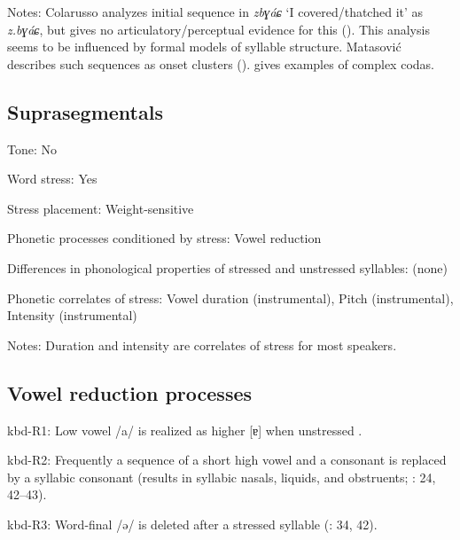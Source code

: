 {\begin{appendixdesc}
\item[Notes:] Colarusso analyzes initial sequence in \textit{zbɣáɕ} ‘I covered/thatched it’ as \textit{z.bɣáɕ}, but gives no articulatory/perceptual evidence for this (\citeyear[17]{Colarusso2006}). This analysis seems to be influenced by formal models of syllable structure. Matasović describes such sequences as onset clusters (\citeyear[13]{Matasović2010}). \citet{Applebaum2013} gives examples of complex codas.
\end{appendixdesc}
\subsection*{Suprasegmentals}
\begin{appendixdesc}
\item[Tone:] No

\item[Word stress:] Yes

\item[Stress placement:] Weight-sensitive

\item[Phonetic processes conditioned by stress:] Vowel reduction

\item[Differences in phonological properties of stressed and unstressed syllables:] (none)

\item[Phonetic correlates of stress:] Vowel duration (instrumental), Pitch (instrumental), Intensity (instrumental)

\item[Notes:] Duration and intensity are correlates of stress for most speakers.
\end{appendixdesc}
\subsection*{Vowel reduction processes}
\begin{appendixdesc}

\item[kbd-R1:] Low vowel /a/ is realized as higher [ɐ] when unstressed \citep[98--99]{Applebaum2013}.

\item[kbd-R2:] Frequently a sequence of a short high vowel and a consonant is replaced by a syllabic consonant (results in syllabic nasals, liquids, and obstruents; \citealt{Kuipers1960}: 24, 42--43).

\item[kbd-R3:] Word-final /ə/ is deleted after a stressed syllable (\citealt{Kuipers1960}: 34, 42).


\end{appendixdesc}}
